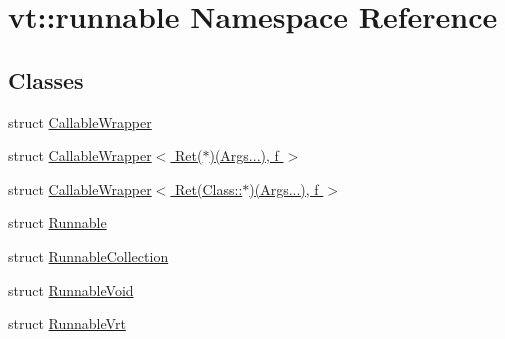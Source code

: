 \hypertarget{namespacevt_1_1runnable}{}\section{vt\+:\+:runnable Namespace Reference}
\label{namespacevt_1_1runnable}
\subsection*{Classes}
\begin{DoxyCompactItemize}
\item 
struct \hyperlink{structvt_1_1runnable_1_1_callable_wrapper}{Callable\+Wrapper}
\item 
struct \hyperlink{structvt_1_1runnable_1_1_callable_wrapper_3_01_ret_07_5_08_07_args_8_8_8_08_00_01f_01_4}{Callable\+Wrapper$<$ Ret($\ast$)(\+Args...), f $>$}
\item 
struct \hyperlink{structvt_1_1runnable_1_1_callable_wrapper_3_01_ret_07_class_1_1_5_08_07_args_8_8_8_08_00_01f_01_4}{Callable\+Wrapper$<$ Ret(\+Class\+::$\ast$)(\+Args...), f $>$}
\item 
struct \hyperlink{structvt_1_1runnable_1_1_runnable}{Runnable}
\item 
struct \hyperlink{structvt_1_1runnable_1_1_runnable_collection}{Runnable\+Collection}
\item 
struct \hyperlink{structvt_1_1runnable_1_1_runnable_void}{Runnable\+Void}
\item 
struct \hyperlink{structvt_1_1runnable_1_1_runnable_vrt}{Runnable\+Vrt}
\end{DoxyCompactItemize}
